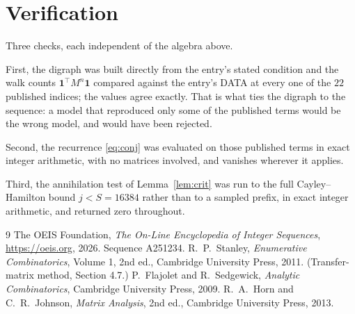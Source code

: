\documentclass[11pt,a4paper]{article}
\theoremstyle{plain}
\theoremstyle{definition}
\begin{document}
\section{Verification}

Three checks, each independent of the algebra above.

First, the digraph was built directly from the entry's stated condition and the walk counts
$\mathbf{1}^{\!\top}M^{n}\mathbf{1}$ compared against the entry's DATA at every one of
the $22$ published indices; the values agree exactly. That is what ties the digraph to
the sequence: a model that reproduced only some of the published terms would be the wrong
model, and would have been rejected.

Second, the recurrence \eqref{eq:conj} was evaluated on those published terms in exact
integer arithmetic, with no matrices involved, and vanishes wherever it applies.

Third, the annihilation test of Lemma~\ref{lem:crit} was run to the full Cayley--Hamilton
bound $j<S=16384$ rather than to a sampled prefix, in exact integer arithmetic, and returned
zero throughout.

\begin{thebibliography}{9}
 The OEIS Foundation, \emph{The On-Line Encyclopedia of Integer
Sequences}, \url{https://oeis.org}, 2026. Sequence A251234.
 R.~P.~Stanley, \emph{Enumerative Combinatorics}, Volume 1, 2nd ed.,
Cambridge University Press, 2011. (Transfer-matrix method, Section 4.7.)
 P.~Flajolet and R.~Sedgewick, \emph{Analytic Combinatorics}, Cambridge
University Press, 2009.
 R.~A.~Horn and C.~R.~Johnson, \emph{Matrix Analysis}, 2nd ed., Cambridge
University Press, 2013.
\end{thebibliography}
\end{document}
